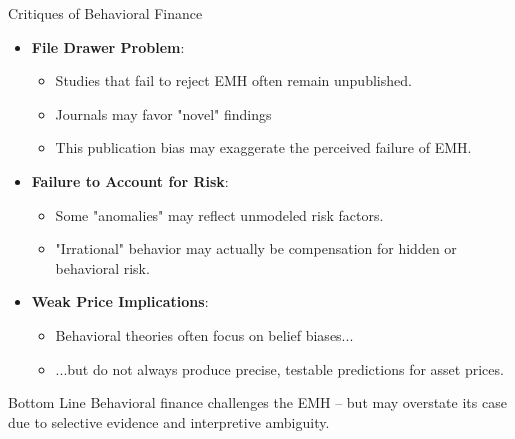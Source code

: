 \begin{frame}{Critiques of Behavioral Finance}

	\begin{itemize}
		\item \textbf{File Drawer Problem}:
		\begin{itemize}
			\item Studies that fail to reject EMH often remain unpublished.
			\item Journals may favor "novel" findings
			\item This publication bias may exaggerate the perceived failure of EMH.
		\end{itemize}
		
		\item \textbf{Failure to Account for Risk}:
		\begin{itemize}
			\item Some "anomalies" may reflect unmodeled risk factors.
			\item "Irrational" behavior may actually be compensation for hidden or behavioral risk.
		\end{itemize}
		
		\item \textbf{Weak Price Implications}:
		\begin{itemize}
			\item Behavioral theories often focus on belief biases...
			\item ...but do not always produce precise, testable predictions for asset prices.
		\end{itemize}
	\end{itemize}
	
	\begin{alertblock}{Bottom Line}
		Behavioral finance challenges the EMH -- but may overstate its case due to selective evidence and interpretive ambiguity.
	\end{alertblock}
	
\end{frame}


